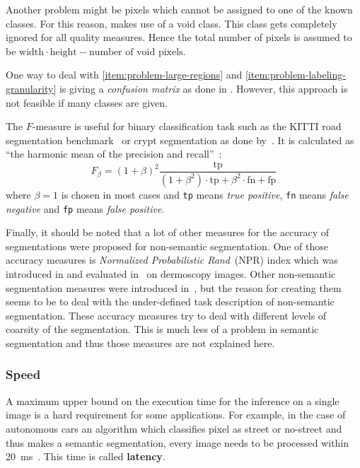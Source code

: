 Another problem might be pixels which cannot be assigned to one of the known
classes. For this reason, \cite{shotton2006textonboost} makes use of a void
class. This class gets completely ignored for all quality measures. Hence the
total number of pixels is assumed to be $\text{width} \cdot \text{height} - \text{number of void pixels}$.

One way to deal with \cref{item:problem-large-regions} and
\cref{item:problem-labeling-granularity} is giving a \textit{confusion matrix}
as done in \cite{shotton2006textonboost}. However, this approach is not
feasible if many classes are given.

The $F$-measure is useful for binary classification task such as the KITTI road
segmentation benchmark~\cite{Fritsch2013ITSC} or crypt segmentation as done
by~\cite{cohen2015memory}. It is calculated as \enquote{the harmonic mean of
the precision and recall}~\cite{pantofaru2005comparison}:
\[F_\beta = (1+\beta)^2 \frac{\text{tp}}{(1+\beta^2)\cdot \text{tp}+ \beta^2 \cdot \text{fn} + \text{fp}}\]
where $\beta=1$ is chosen in most cases and \texttt{tp} means \textit{true
positive}, \texttt{fn} means \textit{false negative} and  \texttt{fp} means
\textit{false positive}.

Finally, it should be noted that a lot of other measures for the accuracy of
segmentations were proposed for non-semantic segmentation. One of those
accuracy measures is \textit{Normalized Probabilistic Rand}~(NPR) index which
was introduced in \cite{unnikrishnan2005measure} and evaluated
in~\cite{celebi2009improved} on dermoscopy images. Other non-semantic
segmentation measures were introduced in~\cite{martin2001database}, but the
reason for creating them seems to be to deal with the under-defined task
description of non-semantic segmentation. These accuracy measures try to deal
with different levels of coarsity of the segmentation. This is much less of a
problem in semantic segmentation and thus those measures are not explained
here.


\subsubsection{Speed}%
\label{subsubsec:speed-quality-measure}%
A maximum upper bound on the execution time for the inference on a single image
is a hard requirement for some applications. For example, in the case of
autonomous cars an algorithm which classifies pixel as street or no-street
and thus makes a semantic segmentation, every image needs to be processed
within \SI{20}{\milli\second}~\cite{bittel2015pixel}. This time is called
\textbf{latency}.

